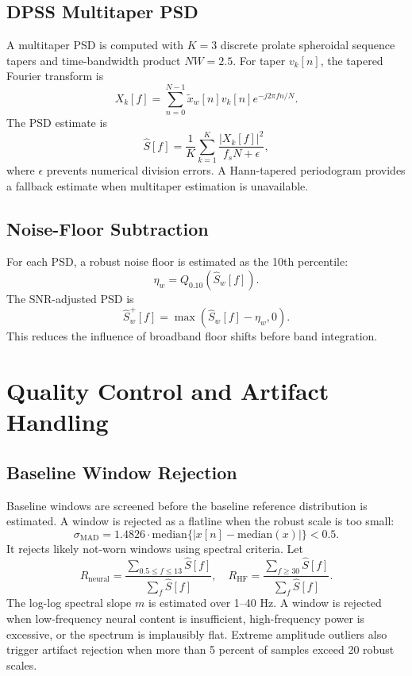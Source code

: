 \documentclass[conference]{IEEEtran}
\begin{document}
\subsection{DPSS Multitaper PSD}
A multitaper PSD is computed with $K=3$ discrete prolate spheroidal sequence tapers and time-bandwidth product $NW=2.5$. For taper $v_k[n]$, the tapered Fourier transform is
\begin{equation}
X_k[f]=\sum_{n=0}^{N-1}\tilde{x}_w[n]v_k[n]e^{-j2\pi fn/N}.
\end{equation}
The PSD estimate is
\begin{equation}
\hat{S}[f]=\frac{1}{K}\sum_{k=1}^{K}\frac{|X_k[f]|^2}{f_sN+\epsilon},
\end{equation}
where $\epsilon$ prevents numerical division errors. A Hann-tapered periodogram provides a fallback estimate when multitaper estimation is unavailable.

\subsection{Noise-Floor Subtraction}
For each PSD, a robust noise floor is estimated as the 10th percentile:
\begin{equation}
\eta_w = Q_{0.10}\left(\hat{S}_w[f]\right).
\end{equation}
The SNR-adjusted PSD is
\begin{equation}
\hat{S}^{+}_w[f]=\max(\hat{S}_w[f]-\eta_w,0).
\end{equation}
This reduces the influence of broadband floor shifts before band integration.

\section{Quality Control and Artifact Handling}
\subsection{Baseline Window Rejection}
Baseline windows are screened before the baseline reference distribution is estimated. A window is rejected as a flatline when the robust scale is too small:
\begin{equation}
\sigma_{\mathrm{MAD}}=1.4826\cdot\mathrm{median}\{|x[n]-\mathrm{median}(x)|\}<0.5.
\end{equation}
It rejects likely not-worn windows using spectral criteria. Let
\begin{equation}
R_{\mathrm{neural}}=\frac{\sum_{0.5\le f\le 13}\hat{S}[f]}{\sum_f\hat{S}[f]},
\quad
R_{\mathrm{HF}}=\frac{\sum_{f\ge 30}\hat{S}[f]}{\sum_f\hat{S}[f]}.
\end{equation}
The log-log spectral slope $m$ is estimated over 1--40 Hz. A window is rejected when low-frequency neural content is insufficient, high-frequency power is excessive, or the spectrum is implausibly flat. Extreme amplitude outliers also trigger artifact rejection when more than 5 percent of samples exceed 20 robust scales.
\end{document}
